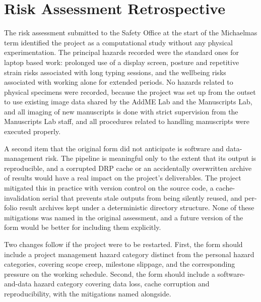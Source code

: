 \section{Risk Assessment Retrospective}
\label{app:risk}


The risk assessment submitted to the Safety Office at the start of
the Michaelmas term identified the project as a computational
study without any physical experimentation. The principal hazards
recorded were the standard ones for laptop based work: prolonged
use of a display screen, posture and repetitive strain risks
associated with long typing sessions, and the wellbeing risks
associated with working alone for extended periods. No hazards
related to physical specimens were recorded, because the project
was set up from the outset to use existing image data shared by
the AddME Lab and the Manuscripts Lab, and all imaging of new manuscripts is done
with strict supervision from the Manuscripts Lab staff, and all procedures related
to handling manuscripts were executed properly.

A second item that the original form did not anticipate is
software and data-management risk. The pipeline is meaningful only
to the extent that its output is reproducible, and a corrupted
DRP cache or an accidentally overwritten archive of results would
have a real impact on the project's deliverables. The project
mitigated this in practice with version control on the source
code, a cache-invalidation serial that prevents stale outputs
from being silently reused, and per-folio result archives kept
under a deterministic directory structure. None of these
mitigations was named in the original assessment, and a future
version of the form would be better for including them
explicitly.

Two changes follow if the project were to be restarted. First,
the form should include a project management hazard category
distinct from the personal hazard categories, covering scope
creep, milestone slippage, and the corresponding pressure on the
working schedule. Second, the form should include a
software-and-data hazard category covering data loss, cache
corruption and reproducibility, with the mitigations named
alongside.
